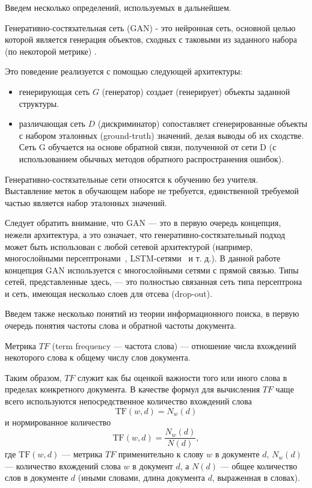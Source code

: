 Введем несколько определений, используемых в дальнейшем.
\begin{defn}
    Генеративно-состязательная сеть (GAN) - это нейронная сеть, основной целью которой является генерация объектов, 
    сходных с таковыми из заданного набора (по некоторой метрике) \cite{10.5555/2969033.2969125}.    
\end{defn}
Это поведение реализуется с помощью следующей архитектуры:
\begin{itemize}
    \item генерирующая сеть $G$ (генератор) создает (генерирует) объекты заданной структуры.
    \item различающая сеть $D$ (дискриминатор) сопоставляет сгенерированные объекты с набором эталонных (ground-truth) значений, 
    делая выводы об их сходстве. Сеть G обучается на основе обратной связи, полученной от сети D (с использованием обычных
    методов обратного распространения ошибок).  
\end{itemize}
Генеративно-состязательные сети относятся к обучению без учителя. Выставление меток в обучающем наборе не требуется, 
единственной требуемой частью является набор эталонных значений.

Следует обратить внимание, что GAN --- это в первую очередь концепция, нежели архитектура, а это означает, что 
генеративно-состязательный подход может быть использован с любой сетевой архитектурой (например, многослойными 
персептронами~\cite{Rosenblatt1958ThePA}, LSTM-сетями~\cite{10.1162/neco.1997.9.8.1735} и т. д.). В данной работе 
концепция GAN используется с многослойными сетями с прямой связью.
Типы сетей, представленные здесь, --- это полностью связанная сеть типа персептрона и сеть, имеющая несколько слоев для отсева
(drop-out).

Введем также несколько понятий из теории информационного поиска, в первую очередь понятия частоты слова и обратной частоты документа.

\begin{defn}
    Метрика $TF$ (term frequency --- частота слова) --- отношение числа вхождений некоторого слова к общему числу слов документа.
\end{defn}
Таким образом, $TF$ служит как бы оценкой важности того или иного слова в пределах конкретного документа.
В качестве формул для вычисления $TF$ чаще всего используются \cite{manning_raghavan_schuetze_2008} 
непосредственное количество вхождений слова
\begin{equation}
    \label{eq:raw-tf}
    \text{TF}(w, d) = N_w(d)
\end{equation}
и нормированное количество
\begin{equation}
    \label{eq:norm-tf}
    \text{TF}(w, d) = \frac{N_w(d)}{N(d)},
\end{equation}
где $\text{TF}(w, d)$ --- метрика $TF$ применительно к слову $w$ в документе $d$, $N_w(d)$ --- количество вхождений слова $w$
в документ $d$, а $N(d)$ --- общее количество слов в документе $d$ (иными словами, длина документа $d$, выраженная в словах).

